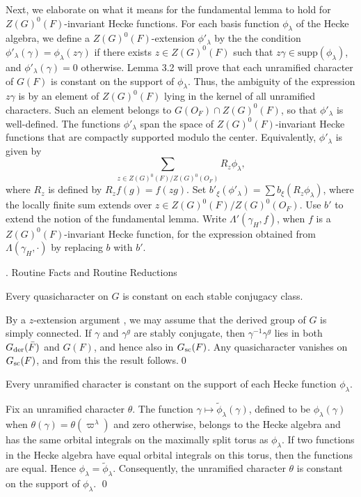 Next, we elaborate on
what it means for the fundamental lemma to hold for $Z(G)^0(F)$-invariant
Hecke functions.
For each basis function $\phi_\lambda$ of the Hecke algebra, we
define a $Z(G)^0(F)$-extension $\phi'_\lambda$ by the the condition
$\phi'_\lambda(\gamma) = \phi_\lambda(z\gamma)$ if there
exists $z\in Z(G)^0(F)$ such that
$z\gamma\in \text{supp}(\phi_\lambda)$, and $\phi'_\lambda(\gamma) = 0$
otherwise.  Lemma 3.2 will prove that each unramified character
of $G(F)$
is constant on the support of $\phi_\lambda$.  Thus, the
ambiguity of the expression $z\gamma$ is by an element of $Z(G)^0(F)$
lying in the kernel of all unramified characters.  Such an
element belongs to $G(O_F) \cap Z(G)^0(F)$, so that $\phi'_\lambda$
is well-defined.   
The functions $\phi'_\lambda$ span the space of $Z(G)^0(F)$-invariant
Hecke functions that are compactly supported modulo the center. 
Equivalently, $\phi'_\lambda$ is given by
$$\sum_{z\in Z(G)^0(F)/Z(G)^0(O_F)} R_z\phi_\lambda,$$
where $R_z$ is defined by $R_zf(g) = f(zg)$.
Set $b'_\xi(\phi'_\lambda) = \sum b_\xi(R_z\phi_\lambda)$,
where the locally finite sum extends over $z\in Z(G)^0(F)/Z(G)^0(O_F)$.  
Use $b'$ to extend the notion
of the fundamental lemma.  
Write $\Lambda'(\gamma_H,f)$, when $f$ is
 a $Z(G)^0(F)$-invariant Hecke function, for the expression obtained
 from $\Lambda(\gamma_H,\cdot)$
 by replacing  $b$ with $b'$.


. Routine Facts and Routine Reductions \endhead


  Every quasicharacter
on $G$ is constant on each stable conjugacy
class.
\endproclaim

  By a $z$-extension argument \cite{Ko1,3.1.2},
we may assume that the derived group of $G$ is simply connected.
If $\gamma$ and $\gamma^g$ are stably conjugate, then
$\gamma^{-1}\gamma^g$ lies in both $G_{{\text{der}}}(\bar F)$ and
$G(F)$, and hence also in $G_{{\text{sc}}}(F)$.  Any quasicharacter
vanishes on $G_{{\text{sc}}}(F)$, and from this the result follows.\qed
\enddemo


Every unramified character is constant on the support
of each Hecke function $\phi_\lambda$.
\endproclaim

  Fix an unramified character $\theta$.
The function
$\gamma\mapsto\tilde\phi_\lambda (\gamma)$, defined to be $\phi_\lambda(\gamma)$
when $\theta(\gamma) = \theta(\varpi^\lambda)$ and zero otherwise,
belongs to the Hecke algebra and has the same orbital integrals
on the maximally split torus as $\phi_\lambda$.  
If two functions in the Hecke algebra have
equal orbital integrals on this torus,
then the functions are equal.  Hence $\phi_\lambda
=\tilde\phi_\lambda$.  Consequently, the unramified character
$\theta$ is constant on the support of $\phi_\lambda$.
\qed
\enddemo


